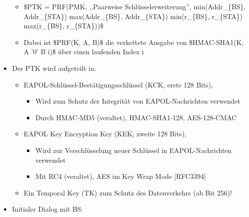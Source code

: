 \documentclass[a4paper]{article}
\begin{document}
\begin{multicols}{3}
\begin{itemize}
              \begin{itemize}
                  \item
                        \$PTK = PRF(PMK, ,,Paarweise Schlüsselerweiterung'',
                        min(Addr\_\{BS\}, Addr\_\{STA\}) \textbar\textbar{}
                        max(Addr\_\{BS\}, Addr\_\{STA\}) \textbar\textbar{} min(r\_\{BS\},
                        r\_\{STA\}) \textbar\textbar{} max(r\_\{BS\}, r\_\{STA\}))\$
                  \item
                        Dabei ist \$PRF(K, A, B)\$ die verkettete Ausgabe von \$HMAC-SHA1(K,
                        A \textbar\textbar{} '0' \textbar\textbar{} B \textbar\textbar{}
                        i)\$ über einen laufenden Index i
              \end{itemize}
        \item
              Der PTK wird aufgeteilt in:

              \begin{itemize}
                  \item
                        EAPOL-Schlüssel-Bestätigungsschlüssel (KCK, erste 128 Bits),

                        \begin{itemize}
                            \item
                                  Wird zum Schutz der Integrität von EAPOL-Nachrichten verwendet
                            \item
                                  Durch HMAC-MD5 (veraltet), HMAC-SHA1-128, AES-128-CMAC
                        \end{itemize}
                  \item
                        EAPOL Key Encryption Key (KEK, zweite 128 Bits),

                        \begin{itemize}
                            \item
                                  Wird zur Verschlüsselung neuer Schlüssel in EAPOL-Nachrichten
                                  verwendet
                            \item
                                  Mit RC4 (veraltet), AES im Key Wrap Mode {[}RFC3394{]}
                        \end{itemize}
                  \item
                        Ein Temporal Key (TK) zum Schutz des Datenverkehrs (ab Bit 256)!
              \end{itemize}
        \item
              Initialer Dialog mit BS:


\end{itemize}
\end{multicols}
\end{document}
